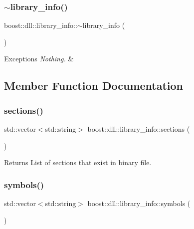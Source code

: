 \subsubsection{\texorpdfstring{$\sim$library\+\_\+info()}{~library\_info()}}
{\footnotesize\ttfamily boost\+::dll\+::library\+\_\+info\+::$\sim$library\+\_\+info (\begin{DoxyParamCaption}{ }\end{DoxyParamCaption})\hspace{0.3cm}{\ttfamily [inline]}}


\begin{DoxyExceptions}{Exceptions}
{\em Nothing.} & \\
\hline
\end{DoxyExceptions}


\subsection{Member Function Documentation}
\mbox{\label{a01704_a0463e65b15beaa6843af435464f28019}} 
\subsubsection{\texorpdfstring{sections()}{sections()}}
{\footnotesize\ttfamily std\+::vector$<$std\+::string$>$ boost\+::dll\+::library\+\_\+info\+::sections (\begin{DoxyParamCaption}{ }\end{DoxyParamCaption})\hspace{0.3cm}{\ttfamily [inline]}}

\begin{DoxyReturn}{Returns}
List of sections that exist in binary file. 
\end{DoxyReturn}
\mbox{\label{a01704_ac033e17288e07d38f3b725a598908a01}} 
\subsubsection{\texorpdfstring{symbols()}{symbols()}\hspace{0.1cm}{\footnotesize\ttfamily [1/3]}}
{\footnotesize\ttfamily std\+::vector$<$std\+::string$>$ boost\+::dll\+::library\+\_\+info\+::symbols (\begin{DoxyParamCaption}{ }\end{DoxyParamCaption})\hspace{0.3cm}{\ttfamily [inline]}}

